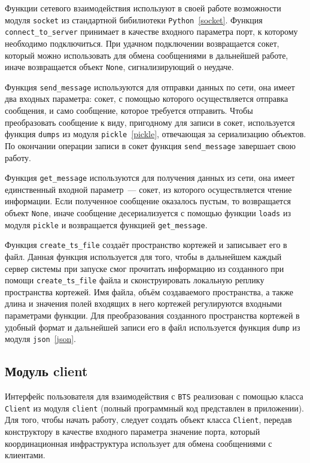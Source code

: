 Функции сетевого взаимодействия используют в своей работе возможности модуля \texttt{socket} из стандартной бибилиотеки \texttt{Python}~\ref{socket}. Функция \texttt{connect_to_server} принимает в качестве входного параметра порт, к которому необходимо подключиться. При удачном подключении возвращается сокет, который можно использовать для обмена сообщениями в дальнейшей работе, иначе возвращается объект \texttt{None}, сигнализирующий о неудаче.

Функция \texttt{send_message} используются для отправки данных по сети, она имеет два входных параметра: сокет, с помощью которого осуществляется отправка сообщения, и само сообщение, которое требуется отправить. Чтобы преобразовать сообщение к виду, пригодному для записи в сокет, используется функция \texttt{dumps} из модуля \texttt{pickle}~\ref{pickle}, отвечающая за сериализацию объектов. По окончании операции записи в сокет функция \texttt{send_message} завершает свою работу.

Функция \texttt{get_message} используются для получения данных из сети, она имеет единственный входной параметр~--- сокет, из которого осуществляется чтение информации. Если полученное сообщение оказалось пустым, то возвращается объект \texttt{None}, иначе сообщение десериализуется с помощью функции \texttt{loads} из модуля \texttt{pickle} и возвращается функцией \texttt{get_message}.

Функция \texttt{create_ts_file} создаёт пространство кортежей и записывает его в файл. Данная функция используется для того, чтобы в дальнейшем каждый сервер системы при запуске смог прочитать информацию из созданного при помощи  \texttt{create_ts_file} файла и сконструировать локальную реплику пространства кортежей. Имя файла, объём создаваемого пространства, а также длина и значения полей входящих в него кортежей регулируются входными параметрами функции. Для преобразования созданного пространства кортежей в удобный формат и дальнейшей записи его в файл используется функция \texttt{dump} из модуля \texttt{json}~\ref{json}.


\subsection{Модуль client}\label{subsec:3}
Интерфейс пользователя для взаимодействия с \texttt{BTS} реализован с помощью класса \texttt{Client} из модуля \texttt{client} (полный программный код представлен в приложении). Для того, чтобы начать работу, следует создать объект класса \texttt{Client}, передав конструктору в качестве входного параметра значение порта, который координационная инфраструктура использует для обмена сообщениями с клиентами.

